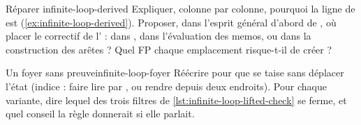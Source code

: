 \begin{exercice}{Réparer }{infinite-loop-derived}
Expliquer, colonne par colonne, pourquoi la ligne de  est  (\cref{ex:infinite-loop-derived}). Proposer, dans l'esprit \og général d'abord\fg{} de , où placer le correctif de l' : dans , dans l'évaluation des memos, ou dans la construction des arêtes ? Quel FP chaque emplacement risque-t-il de créer ?
\end{exercice}

\begin{exercice}{Un foyer sans preuve}{infinite-loop-foyer}
Réécrire  pour que  se taise sans déplacer l'état (indice : faire lire  par , ou rendre  depuis deux endroits). Pour chaque variante, dire lequel des trois filtres de \cref{lst:infinite-loop-lifted-check} se ferme, et quel conseil la règle donnerait si elle parlait.
\end{exercice}


